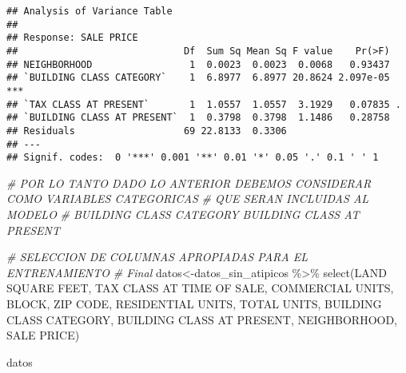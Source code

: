 \documentclass[
]{article}
\newenvironment{Shaded}{\begin{snugshade}}{\end{snugshade}}
\newcommand{\AttributeTok}[1]{\textcolor[rgb]{0.77,0.63,0.00}{#1}}
\newcommand{\CommentTok}[1]{\textcolor[rgb]{0.56,0.35,0.01}{\textit{#1}}}
\newcommand{\FunctionTok}[1]{\textcolor[rgb]{0.00,0.00,0.00}{#1}}
\newcommand{\NormalTok}[1]{#1}
\newcommand{\OtherTok}[1]{\textcolor[rgb]{0.56,0.35,0.01}{#1}}
\newcommand{\SpecialCharTok}[1]{\textcolor[rgb]{0.00,0.00,0.00}{#1}}
\newcommand{\StringTok}[1]{\textcolor[rgb]{0.31,0.60,0.02}{#1}}
\begin{document}
\begin{verbatim}
## Analysis of Variance Table
## 
## Response: SALE PRICE
##                             Df  Sum Sq Mean Sq F value    Pr(>F)    
## NEIGHBORHOOD                 1  0.0023  0.0023  0.0068   0.93437    
## `BUILDING CLASS CATEGORY`    1  6.8977  6.8977 20.8624 2.097e-05 ***
## `TAX CLASS AT PRESENT`       1  1.0557  1.0557  3.1929   0.07835 .  
## `BUILDING CLASS AT PRESENT`  1  0.3798  0.3798  1.1486   0.28758    
## Residuals                   69 22.8133  0.3306                      
## ---
## Signif. codes:  0 '***' 0.001 '**' 0.01 '*' 0.05 '.' 0.1 ' ' 1
\end{verbatim}

\begin{Shaded}
\begin{Highlighting}[]
\CommentTok{\# POR LO TANTO DADO LO ANTERIOR DEBEMOS CONSIDERAR COMO VARIABLES CATEGORICAS}
\CommentTok{\# QUE SERAN INCLUIDAS AL MODELO}
\CommentTok{\# \textasciigrave{}BUILDING CLASS CATEGORY\textasciigrave{}  \textasciigrave{}BUILDING CLASS AT PRESENT\textasciigrave{}}

\CommentTok{\# SELECCION DE COLUMNAS APROPIADAS PARA EL ENTRENAMIENTO}
\CommentTok{\# Final}
\NormalTok{datos}\OtherTok{\textless{}{-}}\NormalTok{datos\_sin\_atipicos }\SpecialCharTok{\%\textgreater{}\%} \FunctionTok{select}\NormalTok{(}\StringTok{\textasciigrave{}}\AttributeTok{LAND SQUARE FEET}\StringTok{\textasciigrave{}}\NormalTok{,}
                                     \StringTok{\textasciigrave{}}\AttributeTok{TAX CLASS AT TIME OF SALE}\StringTok{\textasciigrave{}}\NormalTok{,}
                                     \StringTok{\textasciigrave{}}\AttributeTok{COMMERCIAL UNITS}\StringTok{\textasciigrave{}}\NormalTok{,}
\NormalTok{                                     BLOCK,}
                                     \StringTok{\textasciigrave{}}\AttributeTok{ZIP CODE}\StringTok{\textasciigrave{}}\NormalTok{,}
                                     \StringTok{\textasciigrave{}}\AttributeTok{RESIDENTIAL UNITS}\StringTok{\textasciigrave{}}\NormalTok{,}
                                     \StringTok{\textasciigrave{}}\AttributeTok{TOTAL UNITS}\StringTok{\textasciigrave{}}\NormalTok{,}
                                     \StringTok{\textasciigrave{}}\AttributeTok{BUILDING CLASS CATEGORY}\StringTok{\textasciigrave{}}\NormalTok{,}
                                     \StringTok{\textasciigrave{}}\AttributeTok{BUILDING CLASS AT PRESENT}\StringTok{\textasciigrave{}}\NormalTok{,}
\NormalTok{                                     NEIGHBORHOOD,}
                                     \StringTok{\textasciigrave{}}\AttributeTok{SALE PRICE}\StringTok{\textasciigrave{}}\NormalTok{)}

\NormalTok{datos}
\end{Highlighting}
\end{Shaded}
\end{document}
